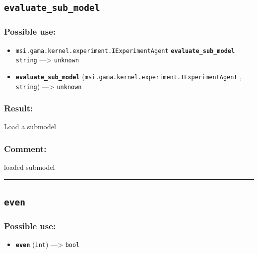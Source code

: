 \documentclass[]{book}
\providecommand{\tightlist}{%
  \setlength{\itemsep}{0pt}\setlength{\parskip}{0pt}}
\theoremstyle{definition}
\theoremstyle{definition}
\theoremstyle{definition}
\theoremstyle{remark}
\begin{document}
\subsection{\texorpdfstring{\texttt{evaluate\_sub\_model}}{evaluate\_sub\_model}}\label{evaluate_sub_model}

\subsubsection{Possible use:}\label{possible-use-156}

\begin{itemize}
\tightlist
\item
  \texttt{msi.gama.kernel.experiment.IExperimentAgent}
  \textbf{\texttt{evaluate\_sub\_model}} \texttt{string}
  ---\textgreater{} \texttt{unknown}
\item
  \textbf{\texttt{evaluate\_sub\_model}}
  (\texttt{msi.gama.kernel.experiment.IExperimentAgent} ,
  \texttt{string}) ---\textgreater{} \texttt{unknown}
\end{itemize}

\subsubsection{Result:}\label{result-150}

Load a submodel

\subsubsection{Comment:}\label{comment-33}

loaded submodel

\begin{center}\rule{0.5\linewidth}{\linethickness}\end{center}

\subsection{\texorpdfstring{\texttt{even}}{even}}\label{even}

\subsubsection{Possible use:}\label{possible-use-157}

\begin{itemize}
\tightlist
\item
  \textbf{\texttt{even}} (\texttt{int}) ---\textgreater{} \texttt{bool}
\end{itemize}
\end{document}
